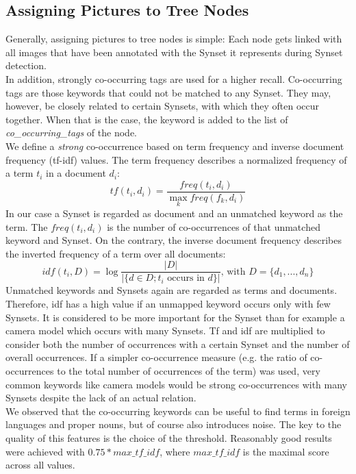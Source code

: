 \subsection{Assigning Pictures to Tree Nodes}
\label{sec_picturestonodes}
Generally, assigning pictures to tree nodes is simple: Each node gets linked with all images that have been annotated with the Synset it represents during Synset detection. \\
In addition, strongly co-occurring tags are used for a higher recall. Co-occurring tags are those keywords that could not be matched to any Synset. They may, however, be closely related to certain Synsets, with which they often occur together. When that is the case, the keyword is added to the list of \emph{co\_occurring\_tags} of the node. \\
We define a \emph{strong} co-occurrence based on term frequency and inverse document frequency (tf-idf)  values. The term frequency describes a normalized frequency of a term $t_i$ in a document $d_i$:
\[tf(t_i,d_i) = \frac{freq(t_i,d_i)}{\max_k freq(f_k,d_i)}\]
In our case a Synset is regarded as document and an unmatched keyword as the term. The $freq(t_i,d_i)$ is the number of co-occurrences of that unmatched keyword and Synset. On the contrary, the inverse document frequency describes the inverted frequency of a term over all documents:
\[idf(t_i, D) = \log \frac{\vert D\vert}{\vert \{d \in D; t_i \text{ occurs in }d\}\vert} \text{, with } D = \{d_1,..., d_n\}\]
Unmatched keywords and Synsets again are regarded as terms and documents. Therefore, idf has a high value if an unmapped keyword occurs only with few Synsets. It is considered to be more important for the Synset than for example a camera model which occurs with many Synsets. Tf and idf are multiplied to consider both the number of occurrences with a certain Synset and the number of overall occurrences.
 If a simpler co-occurrence measure (e.g. the ratio of co-occurrences to the total number of occurrences of the term) was used, very common keywords like camera models would be strong co-occurrences with many Synsets despite the lack of an actual relation. \\
We observed that the co-occurring keywords can be useful to find terms in foreign languages and proper nouns, but of course also introduces noise. The key to the quality of this features is the choice of the threshold. Reasonably good results were achieved with $0.75 * max\_tf\_idf$, where $max\_tf\_idf$ is the maximal score across all values. \\

